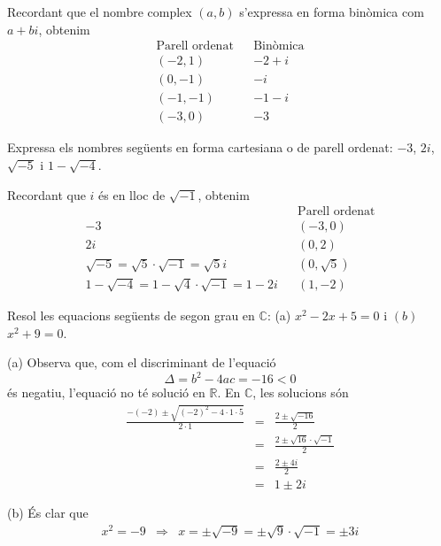 \begin{solucio}
Recordant que el nombre complex $(a,b)$ s’expressa en forma binòmica com $a+bi$, obtenim
\begin{equation*}
\begin{array}{ccc}
\text{Parell ordenat} &  & \text{Binòmica} \\
(-2,1) &  & -2+i \\
(0,-1) &  & -i \\
(-1,-1) &  & -1-i \\
(-3,0) &  & -3
\end{array}
\end{equation*}
\end{solucio}

\begin{exemple}
Expressa els nombres següents en forma cartesiana o de parell ordenat: $
-3 $, $2i$, $\sqrt{-5}$ i $1-\sqrt{-4}$.
\end{exemple}

\begin{solucio}
Recordant que $i$ és en lloc de $\sqrt{-1}$, obtenim
\begin{equation*}
\begin{array}{lll}
&  & \text{Parell ordenat} \\
-3 &  & (-3,0) \\
2i &  & (0,2) \\
\sqrt{-5}=\sqrt{5}\cdot \sqrt{-1}=\sqrt{5}i &  & (0,\sqrt{5}) \\
1-\sqrt{-4}=1-\sqrt{4}\cdot \sqrt{-1}=1-2i &  & (1,-2)
\end{array}
\end{equation*}
\end{solucio}

\begin{exemple}
Resol les equacions següents de segon grau en $\mathbb{C}$: (a) $
x^{2}-2x+5=0$ i $(b)$ \thinspace $x^{2}+9=0$.
\end{exemple}

\begin{solucio}
(a) Observa que, com el discriminant de l’equació
\begin{equation*}
\Delta =b^{2}-4ac=-16<0
\end{equation*}
és negatiu, l’equació no té solució en $\mathbb{R}$. En $
\mathbb{C}$, les solucions són
\begin{eqnarray*}
\frac{-(-2)\pm \sqrt{(-2)^{2}-4\cdot 1\cdot 5}}{2\cdot 1} &=&\frac{2\pm
\sqrt{-16}}{2} \\
&=&\frac{2\pm \sqrt{16}\cdot \sqrt{-1}}{2} \\
&=&\frac{2\pm 4i}{2} \\
&=&1\pm 2i
\end{eqnarray*}

(b) És clar que
\begin{equation*}
\begin{array}{lll}
x^{2}=-9 & \Longrightarrow & x=\pm \sqrt{-9}=\pm \sqrt{9}\cdot \sqrt{-1}=\pm
3i
\end{array}
\end{equation*}
\end{solucio}

